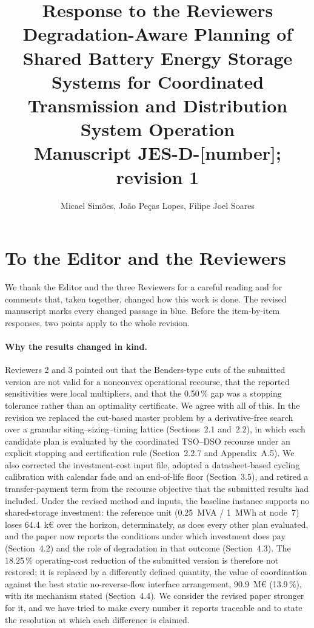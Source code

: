 \documentclass[11pt]{article}
\title{Response to the Reviewers\\
\large Degradation-Aware Planning of Shared Battery Energy Storage Systems for Coordinated Transmission and Distribution System Operation\\
\normalsize Manuscript JES-D-[number]; revision 1}
\author{Micael Sim\~oes, Jo\~ao Pe\c{c}as Lopes, Filipe Joel Soares}
\date{}
\begin{document}
\maketitle

\section*{To the Editor and the Reviewers}

We thank the Editor and the three Reviewers for a careful reading and for comments that, taken
together, changed how this work is done. The revised manuscript marks every changed passage in blue.
Before the item-by-item responses, two points apply to the whole revision.

\paragraph{Why the results changed in kind.}
Reviewers 2 and 3 pointed out that the Benders-type cuts of the submitted version are not valid for a
nonconvex operational recourse, that the reported sensitivities were local multipliers, and that the
0.50\,\% gap was a stopping tolerance rather than an optimality certificate. We agree with all of this. In
the revision we replaced the cut-based master problem by a derivative-free search over a granular
siting--sizing--timing lattice (Sections~2.1 and~2.2), in which each candidate plan is evaluated by the
coordinated TSO--DSO recourse under an explicit stopping and certification rule (Section~2.2.7 and
Appendix~A.5). We also corrected the investment-cost input file, adopted a
datasheet-based cycling calibration with calendar fade and an end-of-life floor (Section~3.5), and
retired a transfer-payment term from the recourse objective that the submitted results had included. Under
the revised method and inputs, the baseline instance supports no shared-storage investment: the reference
unit (0.25~MVA / 1~MWh at node~7) loses 64.4~k\euro{} over the horizon, determinately, as does every other plan
evaluated, and the paper now reports the
conditions under which investment does pay (Section~4.2) and the role of degradation in that outcome
(Section~4.3). The 18.25\,\% operating-cost reduction of the submitted version is therefore not restored;
it is replaced by a differently defined quantity, the value of coordination against the best static
no-reverse-flow interface arrangement, 90.9~M\euro{} (13.9\,\%), with its mechanism stated
(Section~4.4). We consider the revised paper stronger for it, and we have tried to make every number it
reports traceable and to state the resolution at which each difference is claimed.
\end{document}
